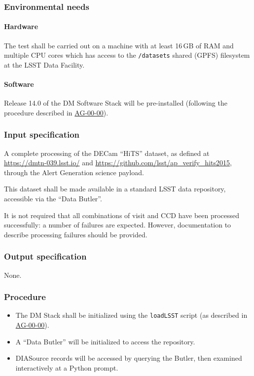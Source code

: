 \subsubsection{Environmental needs}

\paragraph{Hardware}

The test shall be carried out on a machine with at least 16\,GB of RAM and
multiple CPU cores which has access to the \texttt{/datasets} shared (GPFS)
filesystem at the LSST Data Facility.

\paragraph{Software}

Release 14.0 of the DM Software Stack will be pre-installed (following the
procedure described in \hyperref[ag-00-00]{AG-00-00}).

\subsubsection{Input specification}

A complete processing of the DECam ``HiTS'' dataset, as defined at
\url{https://dmtn-039.lsst.io/} and
\url{https://github.com/lsst/ap_verify_hits2015}, through the Alert
Generation science payload.

This dataset shall be made available in a standard LSST data repository,
accessible via the ``Data Butler''.

It is not required that all combinations of visit and CCD have been processed
successfully: a number of failures are expected. However, documentation to
describe processing failures should be provided.

\subsubsection{Output specification}

None.

\subsubsection{Procedure}

\begin{itemize}

  \item{The DM Stack shall be initialized using the \texttt{loadLSST} script
  (as described in \hyperref[ag-00-00]{AG-00-00}).}

  \item{A ``Data Butler'' will be initialized to access the repository.}

  \item{DIASource records will be accessed by querying the Butler, then
  examined interactively at a Python prompt.}

\end{itemize}
